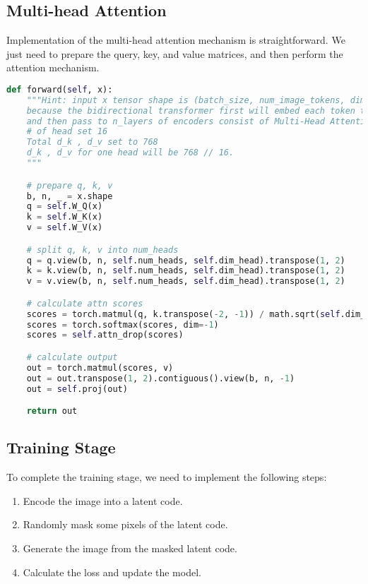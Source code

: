 \subsection{Multi-head Attention}
Implementation of the multi-head attention mechanism is straightforward.
We just need to prepare the query, key, and value matrices, and then perform the attention mechanism.

\begin{lstlisting}[language=Python, caption=models/Transformer/modules/layers.py: MultiHeadAttention.forward]
def forward(self, x):
    """Hint: input x tensor shape is (batch_size, num_image_tokens, dim),
    because the bidirectional transformer first will embed each token to dim dimension,
    and then pass to n_layers of encoders consist of Multi-Head Attention and MLP.
    # of head set 16
    Total d_k , d_v set to 768
    d_k , d_v for one head will be 768 // 16.
    """

    # prepare q, k, v
    b, n, _ = x.shape
    q = self.W_Q(x)
    k = self.W_K(x)
    v = self.W_V(x)

    # split q, k, v into num_heads
    q = q.view(b, n, self.num_heads, self.dim_head).transpose(1, 2)
    k = k.view(b, n, self.num_heads, self.dim_head).transpose(1, 2)
    v = v.view(b, n, self.num_heads, self.dim_head).transpose(1, 2)

    # calculate attn scores
    scores = torch.matmul(q, k.transpose(-2, -1)) / math.sqrt(self.dim_head)
    scores = torch.softmax(scores, dim=-1)
    scores = self.attn_drop(scores)

    # calculate output
    out = torch.matmul(scores, v)
    out = out.transpose(1, 2).contiguous().view(b, n, -1)
    out = self.proj(out)

    return out
\end{lstlisting}

\subsection{Training Stage}
To complete the training stage, we need to implement the following steps:

\begin{enumerate}
    \item Encode the image into a latent code.
    \item Randomly mask some pixels of the latent code.
    \item Generate the image from the masked latent code.
    \item Calculate the loss and update the model.
\end{enumerate}

